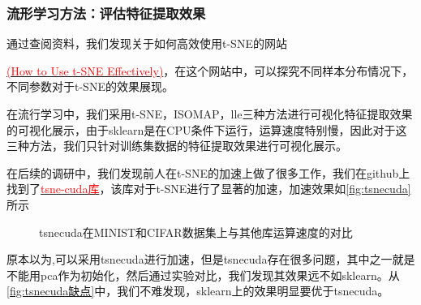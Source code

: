 \documentclass[12pt,hyperref,a4paper,UTF8]{ctexart}
\begin{document}
\subsubsection{流形学习方法：评估特征提取效果}
通过查阅资料，我们发现关于如何高效使用t-SNE的网站{\href{https://distill.pub/2016/misread-tsne}{\textcolor{red}{(How to Use t-SNE Effectively)}}，在这个网站中，可以探究不同样本分布情况下，不同参数对于t-SNE的效果展现。
\par
在流行学习中，我们采用t-SNE，ISOMAP，lle三种方法进行可视化特征提取效果的可视化展示，由于sklearn是在CPU条件下运行，运算速度特别慢，因此对于这三种方法，我们只针对训练集数据的特征提取效果进行可视化展示。
\par
在后续的调研中，我们发现前人在t-SNE的加速上做了很多工作，我们在github上找到了\href{https://github.com/CannyLab/tsne-cuda}{\textcolor{red}{tsne-cuda库}}，该库对于t-SNE进行了显著的加速，加速效果如\autoref{fig:tsnecuda}所示
\begin{figure}[htbp]
	\centering
	\caption{tsnecuda在MINIST和CIFAR数据集上与其他库运算速度的对比}
	\label{fig:tsnecuda}
\end{figure}

\par
原本以为,可以采用tsnecuda进行加速，但是tsnecuda存在很多问题，其中之一就是不能用pca作为初始化，然后通过实验对比，我们发现其效果远不如sklearn。从\autoref{fig:tsnecuda缺点}中，我们不难发现，sklearn上的效果明显要优于tsnecuda。

}
\end{document}
